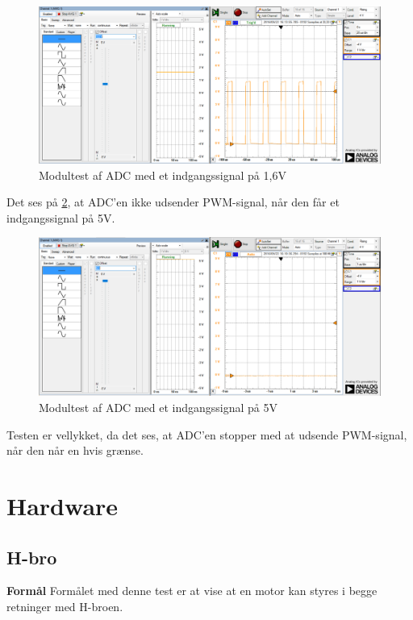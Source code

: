 \begin{figure}[H]
	\centering
	\includegraphics[width=\textwidth]{Test/images/AffyringTest/ADC/1,6V}
	\caption{Modultest af ADC med et indgangssignal på 1,6V}
	\label{fig:1600mV}
\end{figure}

\noindent Det ses på \ref{fig:5V}, at ADC'en ikke udsender PWM-signal, når den får et indgangssignal på 5V. 

\begin{figure}[H]
	\centering
	\includegraphics[width=\textwidth]{Test/images/AffyringTest/ADC/5V}
	\caption{Modultest af ADC med et indgangssignal på 5V}
	\label{fig:5V}
\end{figure}

\noindent Testen er vellykket, da det ses, at ADC'en stopper med at udsende PWM-signal, når den når en hvis grænse. 

\section{Hardware}
\subsection{H-bro}
\textbf{Formål} \newline
\noindent Formålet med denne test er at vise at en motor kan styres i begge retninger med H-broen.\newline


